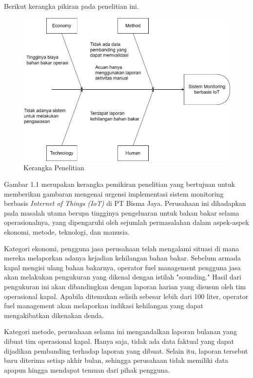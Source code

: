 \noindent Berikut kerangka pikiran pada penelitian ini.

\begin{figure}[ht]
    \includegraphics[width=1\linewidth, center]{images/pendahuluan/fig-framework-penelitian.jpg}
    \caption{Kerangka Penelitian}
    \label{fig:thinking-framework}
\end{figure}

\noindent Gambar 1.1  merupakan kerangka pemikiran penelitian yang bertujuan untuk memberikan gambaran mengenai urgensi implementasi sistem monitoring berbasis \textit{Internet of Things (IoT)} di PT Bisma Jaya. Perusahaan ini dihadapkan pada masalah utama berupa tingginya pengeluaran untuk bahan bakar selama operasionalnya, yang dipengaruhi oleh sejumlah permasalahan dalam aspek-aspek ekonomi, metode, teknologi, dan manusia.

Kategori ekonomi, pengguna jasa perusahaan telah mengalami situasi di mana mereka melaporkan adanya kejadian kehilangan bahan bakar. Sebelum armada kapal mengisi ulang bahan bakarnya, operator fuel management pengguna jasa akan melakukan pengukuran yang dikenal dengan istilah "sounding." Hasil dari pengukuran ini akan dibandingkan dengan laporan harian yang disusun oleh tim operasional kapal. Apabila ditemukan selisih sebesar lebih dari 100 liter, operator fuel management akan melaporkan indikasi kehilangan yang dapat mengakibatkan dikenakan denda.

Kategori metode, perusahaan selama ini mengandalkan laporan bulanan yang dibuat tim operasional kapal. Hanya saja, tidak ada data faktual yang dapat dijadikan pembanding terhadap laporan yang dibuat. Selain itu, laporan tersebut baru diterima setiap akhir bulan, sehingga perusahaan tidak memiliki data apapun hingga mendapat temuan dari pihak pengguna.

